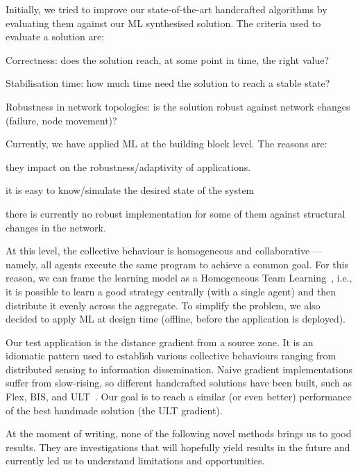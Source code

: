 \documentclass[conference]{IEEEtran}
\begin{document}
Initially, we tried to improve our state-of-the-art handcrafted algorithms by evaluating them against our ML synthesised solution.
%
The criteria used to evaluate a solution are:
\begin{enumerate*}[label=(\roman*)]
    \item Correctness: does the solution reach, at some point in time, the right value?
    \item Stabilisation time: how much time need the solution to reach a stable state?
    \item Robustness in network topologies: is the solution robust against network changes (failure, node movement)?
\end{enumerate*}

Currently, we have applied ML at the building block level.
The reasons are:
\begin{enumerate*}[label=(\roman*)]
\item they impact on the robustness/adaptivity of applications.
\item it is easy to know/simulate the desired state of the system 
\item there is currently no robust implementation for some of them against structural changes in the network.
\end{enumerate*}
%
At this level, the collective behaviour is homogeneous and collaborative --- namely, all agents execute the same program to achieve a common goal.
%
For this reason, we can frame the learning model as a Homogeneous Team Learning~\cite{DBLP:journals/aamas/PanaitL05}, i.e., it is possible to learn a good strategy centrally (with a single agent) and then distribute it evenly across the aggregate.
%
To simplify the problem, we also decided to apply ML at design time (offline, before the application is deployed).

Our test application is the distance gradient from a source zone. %
%
It is an idiomatic pattern used to establish various collective behaviours ranging from distributed sensing to information dissemination.
%
Naive gradient implementations suffer from slow-rising, so different handcrafted solutions have been built, such as Flex, BIS, and ULT~\cite{DBLP:conf/saso/AudritoCDV17}.
%
Our goal is to reach a similar (or even better) performance of the best handmade solution (the ULT gradient).

At the moment of writing, none of the following novel methods brings us to good results. They are investigations that will hopefully yield results in the future and currently led us to understand limitations and opportunities.
\end{document}
